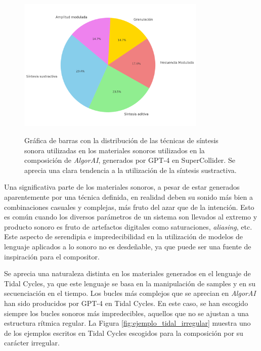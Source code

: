 \begin{figure}[H]
    \caption[Gráfica circular con la distribución de las técnicas de síntesis sonora utilizadas en los materiales sonoros generados por GPT-4 en SuperCollider]{Gráfica de barras con la distribución de las técnicas de síntesis sonora utilizadas en los materiales sonoros utilizados en la composición de \textit{AlgorAI}, generados por GPT-4 en SuperCollider. Se aprecia una clara tendencia a la utilización de la síntesis sustractiva.}
    \centering
    \includegraphics[width=0.8\textwidth]{./figuras/grafica_sintesis_gpt4_quesitos.png}
    \label{fig:grafica_sintesis_gpt4}
\end{figure}

Una significativa parte de los materiales sonoros, a pesar de estar generados aparentemente por una técnica definida, en realidad deben su sonido más bien a combinaciones casuales y complejas, más fruto del azar que de la intención. Esto es común cuando los diversos parámetros de un sistema son llevados al extremo y producto sonoro es fruto de artefactos digitales como saturaciones, \textit{aliasing}, etc. Este aspecto de serendipia e impredecibilidad en la utilización de modelos de lenguaje aplicados a lo sonoro no es desdeñable, ya que puede ser una fuente de inspiración para el compositor.

Se aprecia una naturaleza distinta en los materiales generados en el lenguaje de Tidal Cycles, ya que este lenguaje se basa en la manipulación de samples y en su secuenciación en el tiempo. Los bucles más complejos que se aprecian en \textit{AlgorAI} han sido producidos por GPT-4 en Tidal Cycles. En este caso, se han escogido siempre los bucles sonoros más impredecibles, aquellos que no se ajustan a una estructura rítmica regular. La Figura \ref{fig:ejemplo_tidal_irregular} muestra uno de los ejemplos escritos en Tidal Cycles escogidos para la composición por su carácter irregular.


